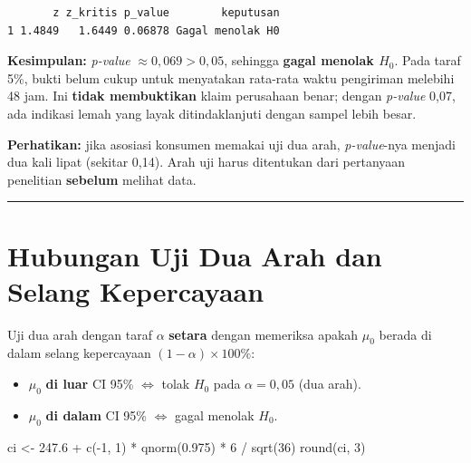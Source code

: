 \documentclass[
  indonesian,
  letterpaper,
]{book}
\newenvironment{Shaded}{\begin{snugshade}}{\end{snugshade}}
\newcommand{\DecValTok}[1]{\textcolor[rgb]{0.68,0.00,0.00}{#1}}
\newcommand{\FloatTok}[1]{\textcolor[rgb]{0.68,0.00,0.00}{#1}}
\newcommand{\FunctionTok}[1]{\textcolor[rgb]{0.28,0.35,0.67}{#1}}
\newcommand{\NormalTok}[1]{\textcolor[rgb]{0.00,0.23,0.31}{#1}}
\newcommand{\OtherTok}[1]{\textcolor[rgb]{0.00,0.23,0.31}{#1}}
\newcommand{\SpecialCharTok}[1]{\textcolor[rgb]{0.37,0.37,0.37}{#1}}
\providecommand{\tightlist}{%
  \setlength{\itemsep}{0pt}\setlength{\parskip}{0pt}}
\begin{document}
\begin{verbatim}
       z z_kritis p_value        keputusan
1 1.4849   1.6449 0.06878 Gagal menolak H0
\end{verbatim}

\textbf{Kesimpulan:} \emph{p-value} \(\approx 0{,}069 > 0{,}05\),
sehingga \textbf{gagal menolak \(H_0\)}. Pada taraf 5\%, bukti belum
cukup untuk menyatakan rata-rata waktu pengiriman melebihi 48 jam. Ini
\textbf{tidak membuktikan} klaim perusahaan benar; dengan \emph{p-value}
0,07, ada indikasi lemah yang layak ditindaklanjuti dengan sampel lebih
besar.

\textbf{Perhatikan:} jika asosiasi konsumen memakai uji dua arah,
\emph{p-value}-nya menjadi dua kali lipat (sekitar 0,14). Arah uji harus
ditentukan dari pertanyaan penelitian \textbf{sebelum} melihat data.

\begin{center}\rule{0.5\linewidth}{0.5pt}\end{center}


\chapter{Hubungan Uji Dua Arah dan Selang
Kepercayaan}\label{hubungan-uji-dua-arah-dan-selang-kepercayaan}

Uji dua arah dengan taraf \(\alpha\) \textbf{setara} dengan memeriksa
apakah \(\mu_0\) berada di dalam selang kepercayaan
\((1 - \alpha) \times 100\%\):

\begin{itemize}
\tightlist
\item
  \(\mu_0\) \textbf{di luar} CI 95\% \(\iff\) tolak \(H_0\) pada
  \(\alpha = 0{,}05\) (dua arah).
\item
  \(\mu_0\) \textbf{di dalam} CI 95\% \(\iff\) gagal menolak \(H_0\).
\end{itemize}

\begin{Shaded}
\begin{Highlighting}[]
\NormalTok{ci }\OtherTok{\textless{}{-}} \FloatTok{247.6} \SpecialCharTok{+} \FunctionTok{c}\NormalTok{(}\SpecialCharTok{{-}}\DecValTok{1}\NormalTok{, }\DecValTok{1}\NormalTok{) }\SpecialCharTok{*} \FunctionTok{qnorm}\NormalTok{(}\FloatTok{0.975}\NormalTok{) }\SpecialCharTok{*} \DecValTok{6} \SpecialCharTok{/} \FunctionTok{sqrt}\NormalTok{(}\DecValTok{36}\NormalTok{)}
\FunctionTok{round}\NormalTok{(ci, }\DecValTok{3}\NormalTok{)}
\end{Highlighting}
\end{Shaded}
\end{document}
